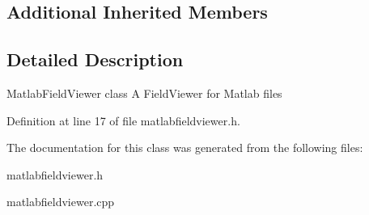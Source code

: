 \subsection*{Additional Inherited Members}


\subsection{Detailed Description}
Matlab\-Field\-Viewer class A Field\-Viewer for Matlab files 

Definition at line 17 of file matlabfieldviewer.\-h.



The documentation for this class was generated from the following files\-:\begin{DoxyCompactItemize}
\item 
matlabfieldviewer.\-h\item 
matlabfieldviewer.\-cpp\end{DoxyCompactItemize}
